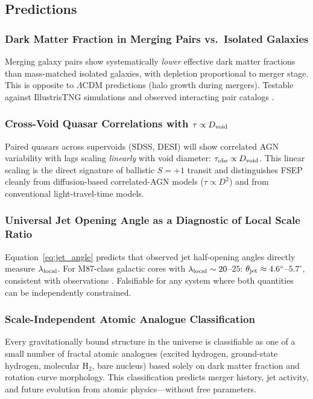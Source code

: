 \documentclass[11pt,letterpaper]{article}
\begin{document}
\subsection{Predictions}

\subsubsection{Dark Matter Fraction in Merging Pairs vs.\ Isolated Galaxies}
Merging galaxy pairs show systematically \textit{lower} effective dark matter
fractions than mass-matched isolated galaxies, with depletion proportional to
merger stage. This is opposite to $\Lambda$CDM predictions (halo growth during
mergers). Testable against IllustrisTNG simulations and observed interacting pair
catalogs \cite{FSEP-I}.

\subsubsection{Cross-Void Quasar Correlations with $\tau \propto D_{\rm void}$}
Paired quasars across supervoids (SDSS, DESI) will show correlated AGN variability
with lags scaling \textit{linearly} with void diameter: $\tau_{\rm obs} \propto
D_{\rm void}$. This linear scaling is the direct signature of ballistic $S{=}+1$
transit and distinguishes FSEP cleanly from diffusion-based correlated-AGN models
($\tau \propto D^2$) and from conventional light-travel-time models.

\subsubsection{Universal Jet Opening Angle as a Diagnostic of Local Scale Ratio}
Equation~\eqref{eq:jet_angle} predicts that observed jet half-opening angles
directly measure $\lambda_{\rm local}$. For M87-class galactic cores with
$\lambda_{\rm local}\sim 20$--$25$: $\theta_{\rm jet}\approx 4.6^\circ$--$5.7^\circ$,
consistent with observations \cite{Nikonov2023}. Falsifiable for any system where
both quantities can be independently constrained.

\subsubsection{Scale-Independent Atomic Analogue Classification}
Every gravitationally bound structure in the universe is classifiable as one of a
small number of fractal atomic analogues (excited hydrogen, ground-state hydrogen,
molecular H$_2$, bare nucleus) based solely on dark matter fraction and rotation
curve morphology. This classification predicts merger history, jet activity, and
future evolution from atomic physics---without free parameters.
\end{document}
